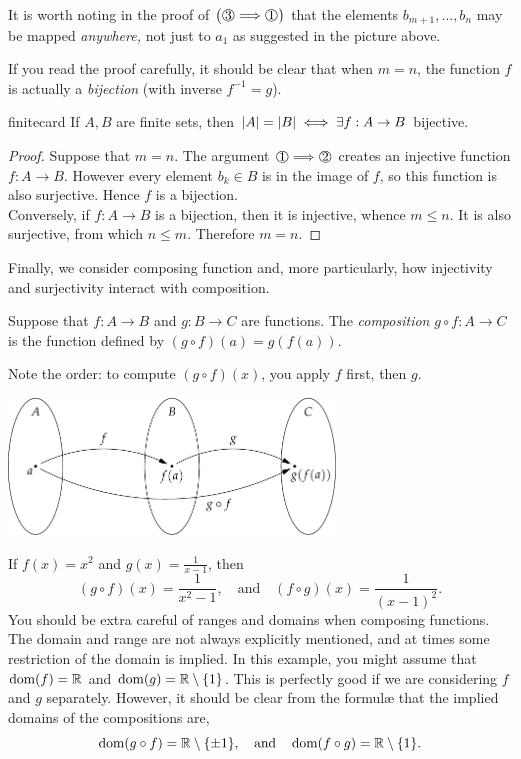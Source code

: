  It is worth noting in the proof of $\bigl(\circint 3\Longrightarrow \circint 1\bigr)$ that the elements $b_{m+1},\ldots,b_n$ may be mapped \emph{anywhere,} not just to $a_1$ as suggested in the picture above.

 If you read the proof carefully, it should be clear that when $m=n$, the function $f$ is actually a \emph{bijection} (with inverse $f^{-1}=g$).


\begin{cor}{}{finitecard}
If $A,B$ are finite sets, then $\left| A\right|=\left| B\right|\iff\exists f:A\to B$ bijective.
\end{cor}

\begin{proof}
Suppose that $m=n$. The argument $\circint 1\Longrightarrow \circint 2$ creates an injective function $f:A\to B$. However every element $b_k\in B$ is in the image of $f$, so this function is also surjective. Hence $f$ is a bijection.\\
Conversely, if $f:A\to B$ is a bijection, then it is injective, whence $m\le n$. It is also surjective, from which $n\le m$. Therefore $m=n$. 
\end{proof}



Finally, we consider composing function and, more particularly, how injectivity and surjectivity interact with composition.

\begin{defn}{}{}
Suppose that $f:A\to B$ and $g:B\to C$ are functions. The \emph{composition} $g\circ f:A\to C$ is the function defined by $(g\circ f)(a)=g(f(a))$.
\end{defn}
Note the order: to compute $(g\circ f)(x)$, you apply $f$ first, then $g$.

\begin{center}
\includegraphics[width=0.65\textwidth]{sets-15-setcomp}
\end{center}

\begin{example}{}{}
If $f(x)=x^2$ and $g(x)=\frac 1{x-1}$, then
\[(g\circ f)(x)=\frac 1{x^2-1},\quad\text{and}\quad(f\circ g)(x)=\frac 1{(x-1)^2}.\]
You should be extra careful of ranges and domains when composing functions. The domain and range are not always explicitly mentioned, and at times some restriction of the domain is implied. In this example, you might assume that $\operatorname{dom}(f)=\mathbb{R}$ and $\operatorname{dom}(g)=\mathbb{R}\setminus\{1\}$. This is perfectly good if we are considering $f$ and $g$ separately. However, it should be clear from the formulæ that the implied domains of the compositions are,
\[\operatorname{dom}(g\circ f)=\mathbb{R}\setminus\{\pm 1\},\quad\text{and}\quad\operatorname{dom}(f\circ g)=\mathbb{R}\setminus\{1\}.\]
\end{example}

